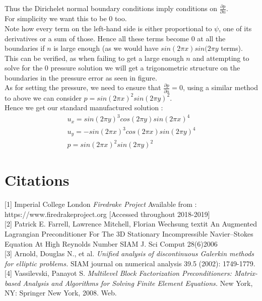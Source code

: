 \documentclass[11pt,twoside,a4paper]{article}
\begin{document}
Thus the Dirichelet normal boundary conditions imply conditions on $\frac{\partial p}{\partial n}$.\\
For simplicity we want this to be $0$ too.\\
Note how every term on the left-hand side is either proportional to $\psi$, one of its derivatives or a sum of those. Hence all these terms become $0$ at all the boundaries if $n$ is large enough (as we would have $ sin(2 \pi x) sin(2 \pi y$ terms).\\
This can be verified, as when failing to get a large enough $n$ and attempting to solve for the $0$ pressure solution we will get a trigonometric structure on the boundaries in the pressure error as seen in figure.\\
As for setting the pressure, we need to ensure that $\frac{\partial p} {\partial n} = 0$, using a similar method to above we can consider $p =  sin(2 \pi x)^2 sin(2 \pi y)^2$.\\
Hence we get our standard manufactured solution :
\begin{align}
u_x = sin(2 \pi y)^3 cos(2 \pi y)sin(2 \pi x)^4 \\
u_y= -sin(2 \pi x)^3 cos(2 \pi x) sin(2 \pi y)^4 \\
p = sin(2 \pi x)^2 sin(2 \pi y)^2
\end{align}
\section{Citations}

[1] Imperial College London \textit{Firedrake Project} Available from : https://www.firedrakeproject.org [Accessed throughout 2018-2019]\\

[2] Patrick E. Farrell, Lawrence Mitchell, Florian Wechsung 
textit{ An Augmented Lagrangian Preconditioner For The 3D Stationary Incompressible Navier–Stokes Equation At High Reynolds Number}
SIAM J. Sci Comput 28(6)2006\\

[3] Arnold, Douglas N., et al. \textit{Unified analysis of discontinuous Galerkin methods for elliptic problems.} SIAM journal on numerical analysis 39.5 (2002): 1749-1779.\\

[4] Vassilevski, Panayot S. \textit{Multilevel Block Factorization Preconditioners: Matrix-based Analysis and Algorithms for Solving Finite Element Equations.} New York, NY: Springer New York, 2008. Web.\\
\end{document}
